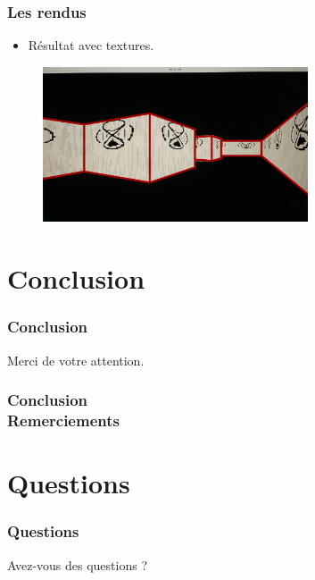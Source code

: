 \documentclass{beamer}
\begin{document}
\begin{frame}
    \frametitle{Les rendus}
    \begin{block}{}
        \begin{itemize}
            \item Résultat avec textures.
        \end{itemize}
    \end{block}
    \begin{figure}
        \centering
        \includegraphics[width=0.7\textwidth]{images/rendu-avec-texture.jpeg}
    \end{figure}
\end{frame}

\section{Conclusion}

\begin{frame}
    \frametitle{Conclusion}
    \begin{block}{}
        \centering
        Merci de votre attention.
    \end{block}
\end{frame}

\begin{frame}
    \frametitle{Conclusion \\
                \small Remerciements}      
    \begin{block}{}
        
    \end{block}         
\end{frame}

\section*{Questions}

\begin{frame}
    \frametitle{Questions}
    \begin{block}{}
        \centering
        Avez-vous des questions ?
    \end{block}
\end{frame}
\end{document}
